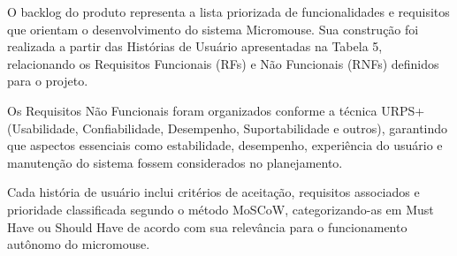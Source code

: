 O backlog do produto representa a lista priorizada de funcionalidades e requisitos que orientam o desenvolvimento do sistema Micromouse. Sua construção foi realizada a partir das Histórias de Usuário apresentadas na Tabela 5, relacionando os Requisitos Funcionais (RFs) e Não Funcionais (RNFs) definidos para o projeto.

Os Requisitos Não Funcionais foram organizados conforme a técnica URPS+ (Usabilidade, Confiabilidade, Desempenho, Suportabilidade e outros), garantindo que aspectos essenciais como estabilidade, desempenho, experiência do usuário e manutenção do sistema fossem considerados no planejamento.

Cada história de usuário inclui critérios de aceitação, requisitos associados e prioridade classificada segundo o método MoSCoW, categorizando-as em Must Have ou Should Have de acordo com sua relevância para o funcionamento autônomo do micromouse.

